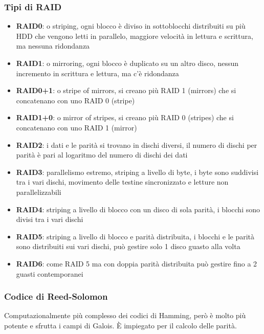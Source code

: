 \documentclass[a4paper]{article}
\begin{document}
\subsubsection*{Tipi di RAID}
\begin{itemize}
	\item \textbf{RAID0}: o striping, ogni blocco è diviso in sottoblocchi distribuiti su più HDD che vengono letti in parallelo,
	maggiore velocità in lettura e scrittura, ma nessuna ridondanza
	\item \textbf{RAID1}: o mirroring, ogni blocco è duplicato su un altro disco, nessun incremento in scrittura e lettura, ma
	c'è ridondanza
	\item \textbf{RAID0+1}: o stripe of mirrors, si creano più RAID 1 (mirrors) che si concatenano con uno RAID 0 (stripe)
	\item \textbf{RAID1+0}: o mirror of stripes, si creano più RAID 0 (stripes) che si concatenano con uno RAID 1 (mirror)
	\item \textbf{RAID2}: i dati e le parità si trovano in dischi diversi, il numero di dischi per parità è pari al logaritmo
	del numero di dischi dei dati
	\item \textbf{RAID3}: parallelismo estremo, striping a livello di byte, i byte sono suddivisi tra i vari dischi, movimento
	delle testine sincronizzato e letture non parallelizzabili
	\item \textbf{RAID4}: striping a livello di blocco con un disco di sola parità, i blocchi sono divisi tra i vari dischi
	\item \textbf{RAID5}: striping a livello di blocco e parità distribuita, i blocchi e le parità sono distribuiti sui vari
	dischi, può gestire solo 1 disco guasto alla volta
	\item \textbf{RAID6}: come RAID 5 ma con doppia parità distribuita può gestire fino a 2 guasti contemporanei
\end{itemize}

\subsubsection*{Codice di Reed-Solomon}
Computazionalmente più complesso dei codici di Hamming, però è molto più potente e sfrutta i campi di Galois. È impiegato per
il calcolo delle parità.

\newpage

\end{document}
